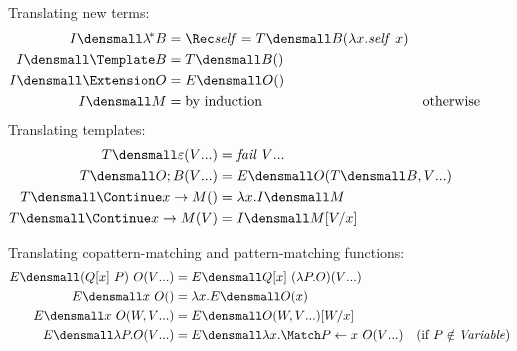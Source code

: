 \documentclass[runningheads]{llncs}
\begin{document}
\begin{figure}
\centering
Translating new terms:  
\begin{align*}
  I\den{\lamstar B}
  &=
  \Rec \mathit{self} = T\den{B}(\lambda x. \mathit{self} ~ x)
  \\
  I\den{\Template B}
  &=
  T\den{B}()
  \\
  I\den{\Extension O}
  &=
  E\den{O}()
  \\
  I\den{M}
  &=
  \text{by induction}
  &\text{otherwise}
\end{align*}
Translating templates:
\begin{align*}
  T\den{\varepsilon}(\many{V})
  &=
  \mathit{fail}~\many{V}
  \\
  T\den{O; B}(\many{V})
  &=
  E\den{O}(T\den{B}, \many{V})
  \\
  T\den{\Continue x \to M}()
  &=
  \lambda x. I\den{M}
  \\
  T\den{\Continue x \to M}(V)
  &=
  I\den{M}\subst{x}{V}
\end{align*}

Translating copattern-matching and pattern-matching functions:
\begin{align*}
  E\den{(Q[x] ~ P) ~ O}(\many{V})
  &=
  E\den{Q[x] ~ (\lambda P. O)}(\many{V})
  \\
  E\den{x ~ O}()
  &=
  \lambda x. E\den{O}(x)
  \\
  E\den{x ~ O}(W, \many{V})
  &=
  E\den{O}(W, \many{V})\subst{x}{W}
  \\
  E\den{\lambda P. O}(\many{V})
  &=
  E\den{\lambda x. \Match P \gets x ~ O}(\many{V})
  &(\text{if } P \notin \mathit{Variable})
\end{align*}


\end{figure}
\end{document}
